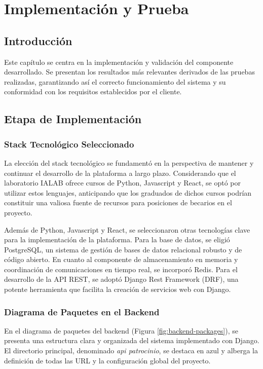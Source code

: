 \chapter{Implementación y Prueba}\label{cap:implementacion-test}

\section{Introducción}
Este capítulo se centra en la implementación y validación del componente desarrollado. Se presentan los resultados más relevantes derivados de las pruebas realizadas, garantizando así el correcto funcionamiento del sistema y su conformidad con los requisitos establecidos por el cliente.



\section{Etapa de Implementación}

\subsection{Stack Tecnológico Seleccionado}
La elección del stack tecnológico se fundamentó en la perspectiva de mantener y continuar el desarrollo de la plataforma a largo plazo. Considerando que el laboratorio IALAB ofrece cursos de Python, Javascript y React, se optó por utilizar estos lenguajes, anticipando que los graduados de dichos cursos podrían constituir una valiosa fuente de recursos para posiciones de becarios en el proyecto.

Además de Python, Javascript y React, se seleccionaron otras tecnologías clave para la implementación de la plataforma. Para la base de datos, se eligió PostgreSQL, un sistema de gestión de bases de datos relacional robusto y de código abierto. En cuanto al componente de almacenamiento en memoria y coordinación de comunicaciones en tiempo real, se incorporó Redis. Para el desarrollo de la API REST, se adoptó Django Rest Framework (DRF), una potente herramienta que facilita la creación de servicios web con Django.


\subsection{Diagrama de Paquetes en el Backend}

En el diagrama de paquetes del backend (Figura \ref{fig:backend-packages}), se presenta una estructura clara y organizada del sistema implementado con Django. El directorio principal, denominado \textit{api patrocinio}, se destaca en azul y alberga la definición de todas las URL y la configuración global del proyecto.


